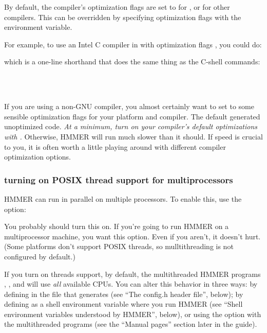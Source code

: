 By default, the compiler's optimization flags are set to
 for , or  for other compilers.
This can be overridden by specifying optimization flags with the
 environment variable. 

For example, to use an Intel C compiler in
 with 
optimization flags , you could do:


which is a one-line shorthand that does the same thing as the C-shell
commands:

\\
\\

If you are using a non-GNU compiler, you almost certainly want to set
 to some sensible optimization flags for your platform
and compiler. The  default generated unoptimized
code. \emph{At a minimum, turn on your compiler's default
optimizations with .} Otherwise, HMMER will run much
slower than it should. If speed is crucial to you, it is often worth a
little playing around with different compiler optimization options.

\subsubsection{turning on POSIX thread support for multiprocessors}

HMMER can run in parallel on multiple processors. To enable
this, use the  option:


You probably should turn this on. If you're going to run HMMER on a
multiprocessor machine, you want this option. Even if you aren't, it
doesn't hurt. (Some platforms don't support POSIX threads, so
mulltithreading is not configured by default.)

If you turn on threads support, by default, the multithreaded HMMER
programs , , and 
will use \emph{all} available CPUs. You can alter this behavior in
three ways: by defining  in the 
file that  generates (see ``The config.h header
file'', below); by defining  as a shell environment
variable where you run HMMER (see ``Shell environment variables
understood by HMMER'', below), or using the  option
with the multithreaded programs (see the ``Manual pages'' section
later in the guide).

